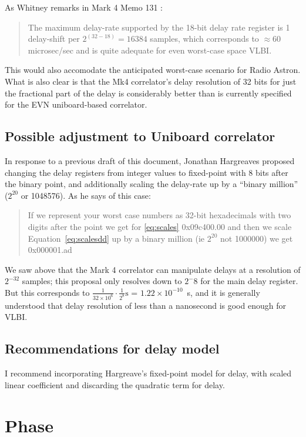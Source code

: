 \documentclass[a4paper]{article}
\begin{document}
As Whitney remarks in Mark 4 Memo 131 \cite{m123}:
\begin{quotation}
  The maximum delay-rate supported by the 18-bit delay rate register
  is 1 delay-shift per $2^(32-18)=16384$ samples, which
  corresponds to $\approx 60$ microsec/sec and is quite adequate for
  even worst-case space VLBI.
\end{quotation}

This would also accomodate the anticipated worst-case scenario for Radio Astron.  What is also clear is that the Mk4 correlator's delay resolution of 32 bits for just the fractional part of the delay is considerably better than is currently specified for the EVN uniboard-based correlator.

\subsection{Possible adjustment to Uniboard correlator}\label{adjust}
In response to a previous draft of this document, Jonathan Hargreaves proposed changing the delay registers from integer values to fixed-point with 8 bits after the binary point, and additionally scaling the delay-rate up by a ``binary million'' ($2^{20}$ or 1048576).  As he says\cite{har2} of this case:

\begin{quotation}
If we represent your worst case numbers as 32-bit hexadecimals with two digits after the point we get for \ref{eq:scales} 0x09c400.00 and then we scale Equation~\ref{eq:scalesdd} up by a binary million (ie $2^20$ not 1000000) we get 0x000001.ad
\end{quotation}

We saw above that the Mark 4 correlator can manipulate delays at a resolution of $2^{-32}$ samples; this proposal only resolves down to $2^-8$ for the main delay register.  But this corresponds to $\frac{1}{32\times 10^6}\cdot \frac{1}{2^8} \textrm{s}$ = $1.22\times 10^{-10}$~s, and it is generally understood that delay resolution of less than a nanosecond is good enough for VLBI.

\subsection{Recommendations for delay model}
I recommend incorporating Hargreave's fixed-point model for delay, with scaled linear coefficient and discarding the quadratic term for delay.

\section{Phase}\label{Phase}
\end{document}
